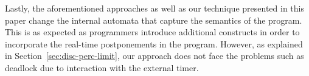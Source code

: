 Lastly, the aforementioned approaches \cite{rsh94,Bourke2009a,glog02} as
well as our technique presented in this paper cha\-nge the internal
automata that capture the semantics of the program. This is as expected
as programmers introduce additional constructs in order to incorporate
the real-time postponements in the program. However, as explained in
Section~\ref{sec:disc-perc-limit}, our approach does not face the
problems such as deadlock due to interaction with the external timer.













